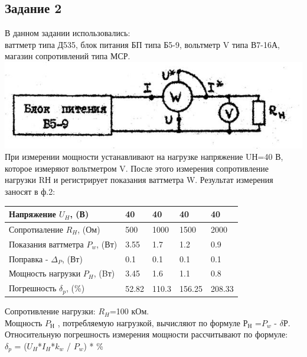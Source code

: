 
\newpage
\subsection*{Задание 2}
	В данном задании использовались:\\
ваттметр типа Д535, блок питания БП типа Б5-9, вольтметр V типа В7-16А, магазин сопротивлений типа МСР.\\
\includegraphics[width=\textwidth]{Part2.png}\\
	При измерении мощности устанавливают на нагрузке напряжение UН=40 В, которое измеряют вольтметром V. После этого измерения сопротивление нагрузки RН и регистрирует показания ваттметра W. Результат измерения заносят в ф.2:\\

	\begin{table} [h!]
 	 \begin{tabular}{|p{6cm}|p{2cm}|p{2cm}|p{2cm}|p{2cm}|}
 	\hline
 	Напряжение $U_{H}$, (В) & 40 & 40 & 40 & 40 \\
 	\hline
 	Сопротиаление $R_{H}$, (Ом) & 500 & 1000 & 1500 & 2000 \\
 	\hline
 	Показания ваттметра $P_{w}$, (Вт) & 3.55 & 1.7 & 1.2 & 0.9 \\
 	\hline
 	Поправка - $\Delta _{P}$, (Вт) & 0.1 & 0.1 & 0.1 & 0.1 \\
 	\hline
 	Мощность нагрузки $P_{H}$, (Bт) & 3.45 & 1.6 & 1.1 & 0.8 \\
 	\hline
 	Погрешность $\delta _{p}$, (\%) & 52.82 & 110.3 & 156.25 & 208.33 \\
 	\hline
 	\end{tabular}
 	\vspace{1cm}
 	Сопротивление нагрузки: $R_{H}$=100 кОм.\\
 	Мощность $P_{Н}$ , потребляемую нагрузкой, вычисляют по формуле $Р_{Н}$ =$P_{w}$ - $\delta$Р.\\
 	Относительную погрешность измерения мощности рассчитывают по формуле:\\
 	$\delta _{p}$ = ($U_{H}$*$I_{H}$*$k_{w}$ / $P_{w}$) * \%
\end{table}
